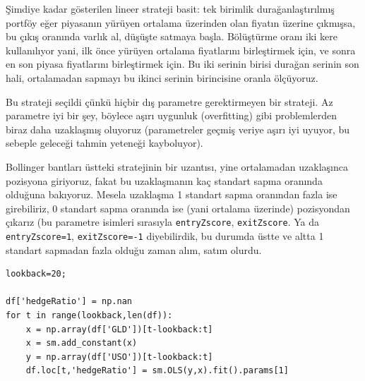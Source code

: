 \documentclass[12pt,fleqn]{article}\usepackage{../../common}
\begin{document}
Şimdiye kadar gösterilen lineer strateji basit: tek birimlik
durağanlaştırılmış portföy eğer piyasanın yürüyen ortalama üzerinden olan
fiyatın üzerine çıkmışsa, bu çıkış oranında varlık al, düşüşte satmaya
başla. Bölüştürme oranı iki kere kullanılıyor yani, ilk önce yürüyen
ortalama fiyatlarını birleştirmek için, ve sonra en son piyasa fiyatlarını
birleştirmek için. Bu iki serinin birisi durağan serinin son hali,
ortalamadan sapmayı bu ikinci serinin birincisine oranla ölçüyoruz. 

Bu strateji seçildi çünkü hiçbir dış parametre gerektirmeyen bir
strateji. Az parametre iyi bir şey, böylece aşırı uygunluk (overfitting)
gibi problemlerden biraz daha uzaklaşmış oluyoruz (parametreler geçmiş
veriye aşırı iyi uyuyor, bu sebeple geleceği tahmin yeteneği kayboluyor). 

Bollinger bantları üstteki stratejinin bir uzantısı, yine ortalamadan
uzaklaşınca pozisyona giriyoruz, fakat bu uzaklaşmanın kaç standart sapma
oranında olduğuna bakıyoruz. Mesela uzaklaşma 1 standart sapma oranından
fazla ise girebiliriz, 0 standart sapma oranında ise (yani ortalama
üzerinde) pozisyondan çıkarız (bu parametre isimleri sırasıyla
\verb!entryZscore!, \verb!exitZscore!. Ya da \verb!entryZscore=1!,
\verb!exitZscore=-1! diyebilirdik, bu durumda üstte ve altta 1 standart
sapmadan fazla olduğu zaman alım, satım olurdu.

\begin{verbatim}
lookback=20;

df['hedgeRatio'] = np.nan
for t in range(lookback,len(df)):
    x = np.array(df['GLD'])[t-lookback:t]
    x = sm.add_constant(x)
    y = np.array(df['USO'])[t-lookback:t]
    df.loc[t,'hedgeRatio'] = sm.OLS(y,x).fit().params[1]   
\end{verbatim}
\end{document}
